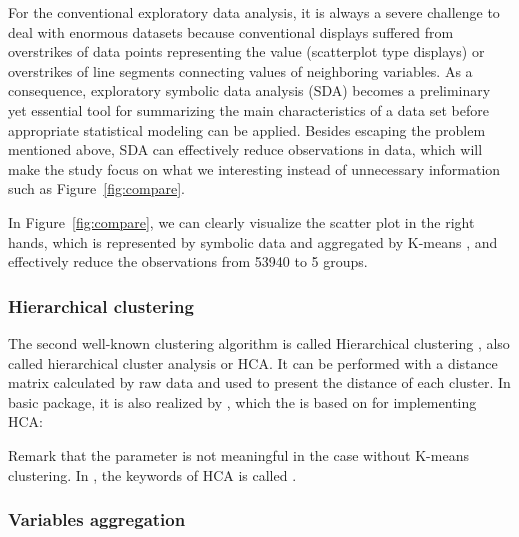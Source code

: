 \documentclass[article]{jss}
\begin{document}
For the conventional exploratory data analysis, it is always a severe
challenge to deal with enormous datasets because conventional displays
suffered from overstrikes of data points representing the value
(scatterplot type displays) or overstrikes of line segments connecting
values of neighboring variables. As a consequence, exploratory
symbolic data analysis (SDA) becomes a preliminary yet essential tool
for summarizing the main characteristics of a data set before
appropriate statistical modeling can be applied. Besides escaping the
problem mentioned above, SDA can effectively reduce observations in
data, which will make the study focus on what we interesting instead
of unnecessary information such as Figure~\ref{fig:compare}.

In Figure~\ref{fig:compare}, we can clearly visualize the scatter plot
in the right hands, which is represented by symbolic data and
aggregated by K-means \cite{macqueen:1967}, and effectively reduce the
observations from 53940 to 5 groups.


\subsubsection{Hierarchical clustering}

The second well-known clustering algorithm is called Hierarchical clustering \cite{Cecil:1966}, also called hierarchical cluster analysis or HCA. It can be performed with a distance matrix
calculated by raw data and used to present the distance of each cluster. In basic  package, it is also realized by , which the  is based on for implementing HCA:

\begin{CodeChunk}
\end{CodeChunk}

Remark that the  parameter is not meaningful in the case without K-means clustering. In , the keywords of HCA is called .

\subsubsection{Variables aggregation}
\end{document}
